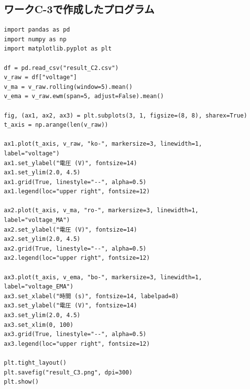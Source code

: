 \subsection{ワークC-3で作成したプログラム}

\begin{lstlisting}[caption={ワークC-3 平滑化および比較描画スクリプト (Python)}, label={lst:c3_smooth}]
import pandas as pd
import numpy as np
import matplotlib.pyplot as plt

df = pd.read_csv("result_C2.csv")
v_raw = df["voltage"]
v_ma = v_raw.rolling(window=5).mean()
v_ema = v_raw.ewm(span=5, adjust=False).mean()

fig, (ax1, ax2, ax3) = plt.subplots(3, 1, figsize=(8, 8), sharex=True)
t_axis = np.arange(len(v_raw))

ax1.plot(t_axis, v_raw, "ko-", markersize=3, linewidth=1, label="voltage")
ax1.set_ylabel("電圧 (V)", fontsize=14)
ax1.set_ylim(2.0, 4.5)
ax1.grid(True, linestyle="--", alpha=0.5)
ax1.legend(loc="upper right", fontsize=12)

ax2.plot(t_axis, v_ma, "ro-", markersize=3, linewidth=1, label="voltage_MA")
ax2.set_ylabel("電圧 (V)", fontsize=14)
ax2.set_ylim(2.0, 4.5)
ax2.grid(True, linestyle="--", alpha=0.5)
ax2.legend(loc="upper right", fontsize=12)

ax3.plot(t_axis, v_ema, "bo-", markersize=3, linewidth=1, label="voltage_EMA")
ax3.set_xlabel("時間 (s)", fontsize=14, labelpad=8)
ax3.set_ylabel("電圧 (V)", fontsize=14)
ax3.set_ylim(2.0, 4.5)
ax3.set_xlim(0, 100)
ax3.grid(True, linestyle="--", alpha=0.5)
ax3.legend(loc="upper right", fontsize=12)

plt.tight_layout()
plt.savefig("result_C3.png", dpi=300)
plt.show()
\end{lstlisting}
